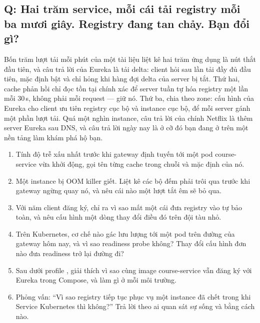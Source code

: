 \subsection*{Q: Hai trăm service, mỗi cái tải registry mỗi ba mươi
giây. Registry đang tan chảy. Bạn đổi gì?}

Bốn trăm lượt tải mỗi phút của một tài liệu liệt kê hai trăm ứng dụng
là nút thắt đầu tiên, và câu trả lời của Eureka là tải delta: client
hỏi  sau lần tải đầy đủ đầu tiên, mặc định bật và chỉ
hỏng khi hàng đợi delta của server bị tắt. Thứ hai, cache phản hồi chỉ
đọc tồn tại chính xác để server tuần tự hóa registry một lần mỗi
30\,s, không phải mỗi request --- giữ nó. Thứ ba, chia theo zone: cấu
hình  của Eureka cho client ưu tiên registry
cục bộ và instance cục bộ, để mỗi server gánh một phần lượt tải. Quá
một nghìn instance, câu trả lời của chính Netflix là thêm server Eureka
sau DNS, và câu trả lời ngày nay là ở cỡ đó bạn đang ở trên một nền
tảng làm khám phá hộ bạn.

\begin{quiz}
\begin{enumerate}
  \item Tính độ trễ xấu nhất trước khi gateway định tuyến tới một pod
  course-service vừa khởi động, gọi tên từng cache trong chuỗi và mặc
  định của nó.
  \item Một instance bị OOM killer giết. Liệt kê các bộ đếm phải trôi
  qua trước khi gateway ngừng quay nó, và nêu cái nào một lượt tắt êm
  sẽ bỏ qua.
  \item Với năm client đăng ký, chỉ ra vì sao mất một cái đưa registry
  vào tự bảo toàn, và nêu cấu hình một dòng thay đổi điều đó trên đội
  tàu nhỏ.
  \item Trên Kubernetes, cơ chế nào gác lưu lượng tới một pod trên
  đường của gateway hôm nay, và vì sao readiness probe không? Thay đổi
  cấu hình đơn nào đưa readiness trở lại đường đi?
  \item Sau  dưới profile ,
  giải thích vì sao cùng image course-service vẫn đăng ký với Eureka
  trong Compose, và  làm gì
  ở mỗi môi trường.
  \item Phỏng vấn: ``Vì sao registry tiếp tục phục vụ một instance đã
  chết trong khi Service Kubernetes thì không?'' Trả lời theo ai quan
  sát sự sống và bằng cách nào.
\end{enumerate}
\end{quiz}
